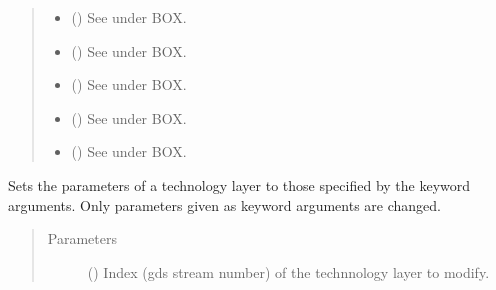 \documentclass[letterpaper,10pt,english,openany]{sphinxmanual}
\begin{document}
\begin{fulllineitems}
\begin{fulllineitems}
\begin{quote}
\begin{description}
\begin{itemize}
\item {} 
 () \textendash{} See \label{\detokenize{source/sonpy:id18}}{\hyperref[\detokenize{source/users_guide:son15}]{\sphinxcrossref{{[}Son15{]}}}} under BOX.

\item {} 
 () \textendash{} See \label{\detokenize{source/sonpy:id19}}{\hyperref[\detokenize{source/users_guide:son15}]{\sphinxcrossref{{[}Son15{]}}}} under BOX.

\item {} 
 () \textendash{} See \label{\detokenize{source/sonpy:id20}}{\hyperref[\detokenize{source/users_guide:son15}]{\sphinxcrossref{{[}Son15{]}}}} under BOX.

\item {} 
 () \textendash{} See \label{\detokenize{source/sonpy:id21}}{\hyperref[\detokenize{source/users_guide:son15}]{\sphinxcrossref{{[}Son15{]}}}} under BOX.

\item {} 
 () \textendash{} See \label{\detokenize{source/sonpy:id22}}{\hyperref[\detokenize{source/users_guide:son15}]{\sphinxcrossref{{[}Son15{]}}}} under BOX.

\end{itemize}

\end{description}\end{quote}

\end{fulllineitems}


\begin{fulllineitems}
\label{\detokenize{source/sonpy:sonpy.sonnet.setTlayer}}
Sets the parameters of a technology layer to those specified by the keyword arguments. Only parameters given as keyword arguments are changed.
\begin{quote}\begin{description}
\item[{Parameters}] \leavevmode
{} () \textendash{} Index (gds stream number) of the technnology layer to modify.


\end{description}
\end{quote}
\end{fulllineitems}
\end{fulllineitems}
\end{document}
